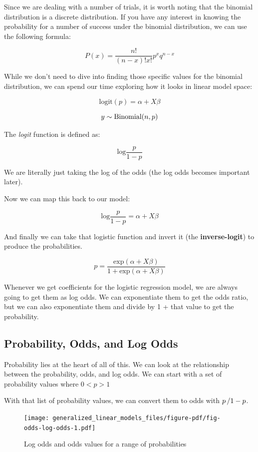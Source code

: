 \documentclass[
  letterpaper,
]{krantz}
\begin{document}
Since we are dealing with a number of trials, it is worth noting that
the binomial distribution is a discrete distribution. If you have any
interest in knowing the probability for a number of success under the
binomial distribution, we can use the following formula:

\[P(x) = \frac{n!}{(n-x)!x!}p^xq^{n-x}\]

While we don't need to dive into finding those specific values for the
binomial distribution, we can spend our time exploring how it looks in
linear model space:

\[
\textrm{logit}(p) = \alpha + X\beta
\]

\[y \sim \textrm{Binomial}(n, p) \\ \]

The \emph{logit} function is defined as:

\[\textrm{log}\frac{p}{1-p}\]

We are literally just taking the log of the odds (the log odds becomes
important later).

Now we can map this back to our model:

\[\textrm{log}\frac{p}{1-p} = \alpha + X\beta\]

And finally we can take that logistic function and invert it (the
\textbf{inverse-logit}) to produce the probabilities.

\[p = \frac{\textrm{exp}(\alpha + X\beta)}{1 + \textrm{exp}(\alpha + X\beta)}\]

Whenever we get coefficients for the logistic regression model, we are
always going to get them as log odds. We can exponentiate them to get
the odds ratio, but we can also exponentiate them and divide by 1 + that
value to get the probability.

\subsection{Probability, Odds, and Log
Odds}\label{sec-glm-binomial-prob}

Probability lies at the heart of all of this. We can look at the
relationship between the probability, odds, and log odds. We can start
with a set of probability values where \(0 < p > 1\)

With that list of probability values, we can convert them to odds with
\(\\p\, / 1 - p\).

\begin{figure}

{\centering \texttt{[image: generalized\_linear\_models\_files/figure-pdf/fig-odds-log-odds-1.pdf]}

}

\caption{\label{fig-odds-log-odds}Log odds and odds values for a range
of probabilities}

\end{figure}
\end{document}
